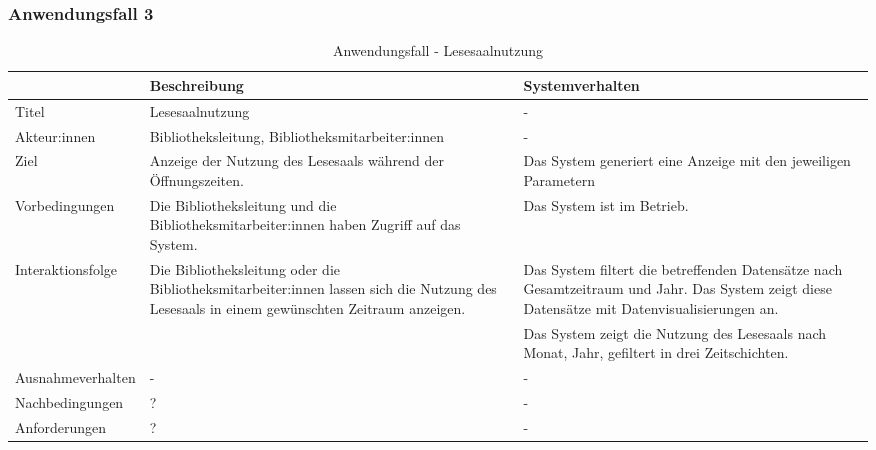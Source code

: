\subsubsection{Anwendungsfall 3}

\begingroup
\setlength{\tabcolsep}{10pt} %
\renewcommand{\arraystretch}{1.25} 
\begin{table}[H]
    \centering
    \begin{adjustbox}{max width=\textwidth}
    \begin{tabular}{lp{7.0cm}p{7.0cm}}
       \toprule
       \textbf{}          & \textbf{Beschreibung} &\textbf{Systemverhalten}\\
       \midrule
        Titel                            &Lesesaalnutzung& -\\
        Akteur:innen                     &Bibliotheksleitung, Bibliotheksmitarbeiter:innen& -\\
        Ziel                             &Anzeige der Nutzung des Lesesaals während der Öffnungszeiten.& Das System generiert eine Anzeige mit den jeweiligen Parametern\\
        Vorbedingungen                   &Die Bibliotheksleitung und die Bibliotheksmitarbeiter:innen haben Zugriff auf das System.& Das System ist im Betrieb.\\
        Interaktionsfolge                &Die Bibliotheksleitung oder die Bibliotheksmitarbeiter:innen lassen sich die Nutzung des Lesesaals in einem gewünschten Zeitraum anzeigen. & Das System filtert die betreffenden Datensätze nach Gesamtzeitraum und Jahr. Das System zeigt diese Datensätze mit Datenvisualisierungen an.\\
                                         & &Das System zeigt die Nutzung des Lesesaals nach Monat, Jahr, gefiltert in drei Zeitschichten.\\
        Ausnahmeverhalten               &- & -\\
        Nachbedingungen                 &?& -\\

        Anforderungen                   &?& -\\
        \bottomrule
    \end{tabular}
    \end{adjustbox}
    \caption{%
    Anwendungsfall - Lesesaalnutzung    }
    \label{tab:AF_Lesesaalnutzung}
    \end{table}
\endgroup



